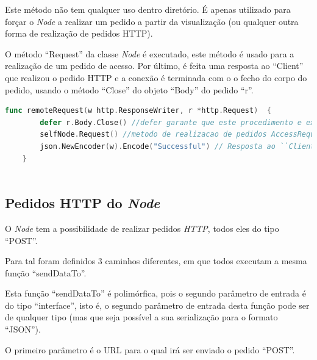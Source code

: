 Este método não tem qualquer uso dentro diretório.
É apenas utilizado para forçar o \emph{Node} a realizar um pedido a partir da visualização (ou qualquer outra forma de realização de pedidos \acs{HTTP}).

O método ``Request'' da classe \emph{Node} é executado, este método é usado para a realização de um pedido de acesso.
Por último, é feita uma resposta ao ``Client'' que realizou o pedido \acs{HTTP} e a conexão é terminada com 
o o fecho do corpo do pedido, usando o método ``Close'' do objeto ``Body'' do pedido ``r''.

\begin{lstlisting}[caption={\emph{Handler} ``remoteRequest'' do método ``/remoteRequest''},language=Go]
	func remoteRequest(w http.ResponseWriter, r *http.Request)  {
		defer r.Body.Close() //defer garante que este procedimento e executado quando a execucao deste ``Handler'' termina
		selfNode.Request() //metodo de realizacao de pedidos AccessRequest
		json.NewEncoder(w).Encode("Successful") // Resposta ao ``Client'' que realizou o pedido
	}
	

\end{lstlisting}

\subsection*{Pedidos \acs{HTTP} do \emph{Node}}
O \emph{Node} tem a possibilidade de realizar pedidos \emph{HTTP}, todos eles do tipo ``POST''.

Para tal foram definidos 3 caminhos diferentes, em que todos executam a mesma função ``sendDataTo''.

Esta função ``sendDataTo'' é polimórfica, pois o segundo parâmetro de entrada é do tipo ``interface'', isto é, o segundo parâmetro
de entrada desta função pode ser de qualquer tipo (mas que seja possível a sua serialização para o formato ``JSON'').

O primeiro parâmetro é o \acs{URL} para o qual irá ser enviado o pedido ``POST''.

